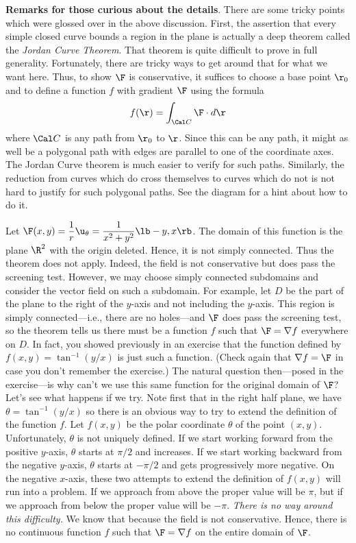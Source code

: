\noindent
{\bf Remarks for those curious about the details}.  
There are some tricky points which were
glossed over in the above discussion.
  First, the assertion that every simple closed
curve bounds a region in the plane is actually a deep theorem
called the {\it Jordan Curve Theorem}.  That theorem is 
quite difficult to prove in full generality.  Fortunately,
there are tricky ways to get around that for what we want here.
Thus, to show $\F$ is conservative, it suffices to choose a
base point $\r_0$ and to define
a function $f$ with gradient $\F$ using the formula
$$
    f(\r) = \int_{\Cal C} \F\cdot d\r
$$
where $\Cal C$ is any path from  $\r_0$
to  $\r$.  Since this can be any path, it might as
well be a polygonal path with edges are parallel to one of
the coordinate axes.   The Jordan Curve theorem is much easier 
to verify for such paths.   Similarly, the reduction
from curves which do cross themselves to curves which do
not is not hard to justify for such polygonal paths.  See the
diagram for a hint about how to do it.
\medskip
\centerline{}
\medskip
{}   Let $\F(x,y) = \dfrac 1r\u_\theta
= \dfrac 1{x^2 + y^2} \lb -y, x\rb$.  The domain of this
function is the plane $\R^2$ with the origin deleted.  Hence,
it is not simply connected.  Thus the theorem does not apply.  Indeed,
the field is not conservative but does pass the screening test.
However, we may choose simply connected subdomains and consider
the vector field on such a subdomain.  For example, let
$D$ be the part of the plane to the right of the $y$-axis and
not including the $y$-axis.  This region is simply connected---i.e.,
there are no holes---and $\F$ does pass the screening test, so
the theorem tells us there must be a function $f$ such
that $\F = \nabla f$ everywhere
on $D$.   In fact, you showed previously in an exercise that
the function defined by $f(x,y) = \tan^{-1}(y/x)$ is just such
a function.  (Check again that $\nabla f = \F$ in
case you don't remember the exercise.)  The natural question
then---posed in the exercise---is why can't we use this same
function for the original domain of $\F$?  Let's see what
happens if we try.  Note first  that in the right
half plane, we have  $\theta = \tan^{-1}(y/x)$ so there is
an obvious way to try to extend the definition of the
function $f$.  Let $f(x,y)$ be the polar coordinate
$\theta$ of the point $(x,y)$.  Unfortunately, $\theta$ is not
uniquely defined.  If we start working forward from the
positive $y$-axis, $\theta$ starts at $\pi/2$ and increases.
If we start working backward from the negative $y$-axis,
$\theta$ starts at $-\pi/2$ and gets progressively more
negative.  On the negative $x$-axis, these two attempts to
extend the definition of $f(x,y)$ will run into a problem.
If we approach from above the proper value will be $\pi$,
but if we approach from below the proper value will be
$-\pi$.   {\it There is no way around this difficulty.}  We know
that because the field is not conservative.  Hence, there is
no continuous function $f$ such that $\F = \nabla f$ on the entire domain
of $\F$.  
\endexample


